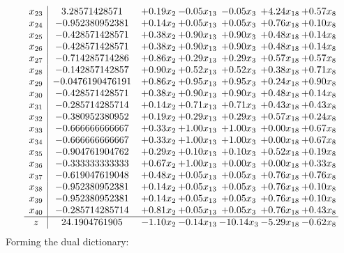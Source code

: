\documentclass[8pt]{article}
\begin{document}
\[\begin{array}{c| c c@{\hskip 2pt} c@{\hskip 2pt} c@{\hskip 2pt} c@{\hskip 2pt} c@{\hskip 2pt} }
 x_{23}   &  3.28571428571 & +  0.19 x_{2} & -0.05 x_{13} & -0.05 x_{3} & +  4.24 x_{18} & +  0.57 x_{8}\\
 x_{24}   &  -0.952380952381 & +  0.14 x_{2} & +  0.05 x_{13} & +  0.05 x_{3} & +  0.76 x_{18} & +  0.10 x_{8}\\
 x_{25}   &  -0.428571428571 & +  0.38 x_{2} & +  0.90 x_{13} & +  0.90 x_{3} & +  0.48 x_{18} & +  0.14 x_{8}\\
 x_{26}   &  -0.428571428571 & +  0.38 x_{2} & +  0.90 x_{13} & +  0.90 x_{3} & +  0.48 x_{18} & +  0.14 x_{8}\\
 x_{27}   &  -0.714285714286 & +  0.86 x_{2} & +  0.29 x_{13} & +  0.29 x_{3} & +  0.57 x_{18} & +  0.57 x_{8}\\
 x_{28}   &  -0.142857142857 & +  0.90 x_{2} & +  0.52 x_{13} & +  0.52 x_{3} & +  0.38 x_{18} & +  0.71 x_{8}\\
 x_{29}   &  -0.0476190476191 & +  0.86 x_{2} & +  0.95 x_{13} & +  0.95 x_{3} & +  0.24 x_{18} & +  0.90 x_{8}\\
 x_{30}   &  -0.428571428571 & +  0.38 x_{2} & +  0.90 x_{13} & +  0.90 x_{3} & +  0.48 x_{18} & +  0.14 x_{8}\\
 x_{31}   &  -0.285714285714 & +  0.14 x_{2} & +  0.71 x_{13} & +  0.71 x_{3} & +  0.43 x_{18} & +  0.43 x_{8}\\
 x_{32}   &  -0.380952380952 & +  0.19 x_{2} & +  0.29 x_{13} & +  0.29 x_{3} & +  0.57 x_{18} & +  0.24 x_{8}\\
 x_{33}   &  -0.666666666667 & +  0.33 x_{2} & +  1.00 x_{13} & +  1.00 x_{3} & +  0.00 x_{18} & +  0.67 x_{8}\\
 x_{34}   &  -0.666666666667 & +  0.33 x_{2} & +  1.00 x_{13} & +  1.00 x_{3} & +  0.00 x_{18} & +  0.67 x_{8}\\
 x_{35}   &  -0.904761904762 & +  0.29 x_{2} & +  0.10 x_{13} & +  0.10 x_{3} & +  0.52 x_{18} & +  0.19 x_{8}\\
 x_{36}   &  -0.333333333333 & +  0.67 x_{2} & +  1.00 x_{13} & +  0.00 x_{3} & +  0.00 x_{18} & +  0.33 x_{8}\\
 x_{37}   &  -0.619047619048 & +  0.48 x_{2} & +  0.05 x_{13} & +  0.05 x_{3} & +  0.76 x_{18} & +  0.76 x_{8}\\
 x_{38}   &  -0.952380952381 & +  0.14 x_{2} & +  0.05 x_{13} & +  0.05 x_{3} & +  0.76 x_{18} & +  0.10 x_{8}\\
 x_{39}   &  -0.952380952381 & +  0.14 x_{2} & +  0.05 x_{13} & +  0.05 x_{3} & +  0.76 x_{18} & +  0.10 x_{8}\\
 x_{40}   &  -0.285714285714 & +  0.81 x_{2} & +  0.05 x_{13} & +  0.05 x_{3} & +  0.76 x_{18} & +  0.43 x_{8}\\
\hline
z    &  24.1904761905 & -1.10 x_{2} & -0.14 x_{13} & -10.14 x_{3} & -5.29 x_{18} & -0.62 x_{8}\\
\end{array}\]
Forming the dual dictionary:
\end{document}
